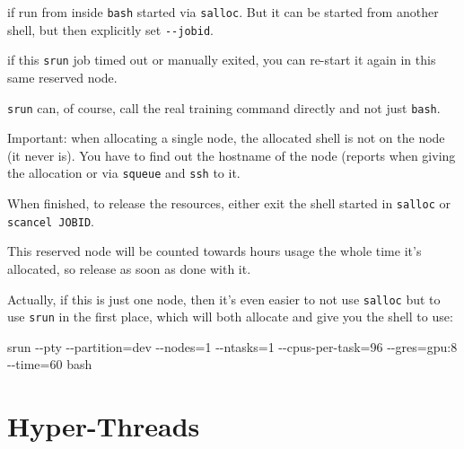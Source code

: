 \documentclass[
]{report}
\newenvironment{Shaded}{\begin{snugshade}}{\end{snugshade}}
\newcommand{\AttributeTok}[1]{\textcolor[rgb]{0.40,0.45,0.13}{#1}}
\newcommand{\ExtensionTok}[1]{\textcolor[rgb]{0.00,0.23,0.31}{#1}}
\newcommand{\NormalTok}[1]{\textcolor[rgb]{0.00,0.23,0.31}{#1}}
\newcommand{\OperatorTok}[1]{\textcolor[rgb]{0.37,0.37,0.37}{#1}}
\newcommand{\VariableTok}[1]{\textcolor[rgb]{0.07,0.07,0.07}{#1}}
\begin{document}
\begin{Shaded}
\end{Shaded}

if run from inside \texttt{bash} started via \texttt{salloc}. But it can
be started from another shell, but then explicitly set
\texttt{-\/-jobid}.

if this \texttt{srun} job timed out or manually exited, you can re-start
it again in this same reserved node.

\texttt{srun} can, of course, call the real training command directly
and not just \texttt{bash}.

Important: when allocating a single node, the allocated shell is not on
the node (it never is). You have to find out the hostname of the node
(reports when giving the allocation or via \texttt{squeue} and
\texttt{ssh} to it.

When finished, to release the resources, either exit the shell started
in \texttt{salloc} or \texttt{scancel\ JOBID}.

This reserved node will be counted towards hours usage the whole time
it's allocated, so release as soon as done with it.

Actually, if this is just one node, then it's even easier to not use
\texttt{salloc} but to use \texttt{srun} in the first place, which will
both allocate and give you the shell to use:

\begin{Shaded}
\begin{Highlighting}[]
\ExtensionTok{srun} \AttributeTok{{-}{-}pty} \AttributeTok{{-}{-}partition}\OperatorTok{=}\NormalTok{dev }\AttributeTok{{-}{-}nodes}\OperatorTok{=}\NormalTok{1 }\AttributeTok{{-}{-}ntasks}\OperatorTok{=}\NormalTok{1 }\AttributeTok{{-}{-}cpus{-}per{-}task}\OperatorTok{=}\NormalTok{96 }\AttributeTok{{-}{-}gres}\OperatorTok{=}\NormalTok{gpu:8 }\AttributeTok{{-}{-}time}\OperatorTok{=}\NormalTok{60 bash}
\end{Highlighting}
\end{Shaded}

\section{Hyper-Threads}\label{hyper-threads}
\end{document}
